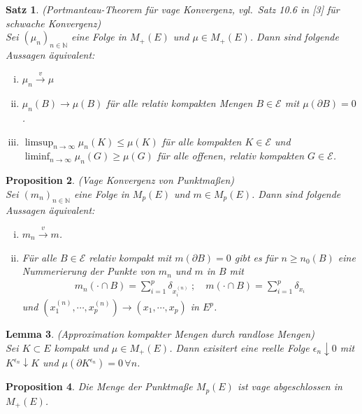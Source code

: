 \documentclass[twoside]{article}
\newcounter{lecnum}
\newtheorem{theorem}{Satz}[lecnum]
\newtheorem{lemma}[theorem]{Lemma}
\newtheorem{proposition}[theorem]{Proposition}
\theoremstyle{definition}
\begin{document}
\begin{theorem} (Portmanteau-Theorem für vage Konvergenz, vgl.\ Satz 10.6 in [3] für schwache Konvergenz)\\
Sei $(\mu_n)_{n \in \mathbb{N}}$ eine Folge in $M_+(E)$ und $\mu \in M_+(E)$. Dann sind folgende Aussagen äquivalent:
\begin{enumerate}[(i)]
\item $\mu_n \xrightarrow{v} \mu$
\item $\mu_n(B) \to \mu(B)$ für alle relativ kompakten Mengen $B \in \mathcal{E}$ mit $\mu(\partial B) = 0$.
\item $\limsup_{n \to \infty} \mu_n(K) \leq \mu(K)$ für alle kompakten $K \in \mathcal{E}$ und $\liminf_{n \to \infty} \mu_n(G) \geq \mu(G)$ für alle offenen, relativ kompakten $G \in \mathcal{E}$.
\end{enumerate}
\end{theorem}
\newpage
\begin{proposition} (Vage Konvergenz von Punktmaßen)\\
Sei $(m_n)_{n \in \mathbb{N}}$ eine Folge in $M_p(E)$ und $m \in M_p(E)$. Dann sind folgende Aussagen äquivalent:
\begin{enumerate}[(i)]
\item $m_n \xrightarrow{v} m$.
\item Für alle $B \in \mathcal{E}$ relativ kompakt mit $m(\partial B) = 0$ gibt es für $n \geq n_0(B)$ eine Nummerierung der Punkte von $m_n$ und $m$ in $B$ mit
\begin{align}
m_n(\cdot \cap B) = \sum_{i=1}^p \delta_{x_i^{(n)}} \; ; \quad m(\cdot \cap B) = \sum_{i=1}^p \delta_{x_i} \label{eq:pktmass}
\end{align}
und $(x_1^{(n)}, \cdots , x_p^{(n)}) \to (x_1, \cdots , x_p)$ in $E^p$.
\end{enumerate}
\end{proposition}

\begin{lemma} (Approximation kompakter Mengen durch randlose Mengen)\\
Sei $K \subset E$ kompakt und $\mu \in M_+(E)$. Dann exisitert eine reelle Folge $\epsilon_n \downarrow 0$ mit $K^{\epsilon_n} \downarrow K$ und $\mu(\partial K^{\epsilon_n} ) = 0 \, \forall n$.
\end{lemma}

\begin{proposition} 
Die Menge der Punktmaße $M_p(E)$ ist vage abgeschlossen in  $M_+(E)$.
\end{proposition}
\end{document}
